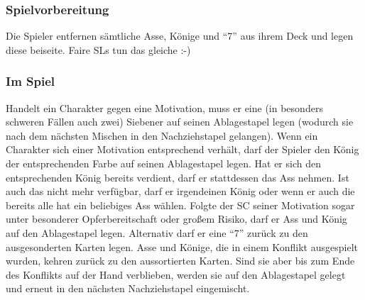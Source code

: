 \subsubsection{Spielvorbereitung}
Die Spieler entfernen sämtliche Asse, Könige und "`7"' aus ihrem Deck und legen diese beiseite. Faire SLs tun das gleiche :-)
\subsubsection{Im Spiel}
Handelt ein Charakter gegen eine Motivation, muss er eine (in besonders schweren Fällen auch zwei) Siebener auf seinen Ablagestapel legen (wodurch sie nach dem nächsten Mischen in den Nachziehstapel gelangen). Wenn ein Charakter sich einer Motivation entsprechend verhält, darf der Spieler den König der entsprechenden Farbe auf seinen Ablagestapel legen. Hat er sich den entsprechenden König bereits verdient, darf er stattdessen das Ass nehmen. Ist auch das nicht mehr verfügbar, darf er irgendeinen König oder wenn er auch die bereits alle hat ein beliebiges Ass wählen. Folgte der SC seiner Motivation sogar unter besonderer Opferbereitschaft oder großem Risiko, darf er Ass und König auf den Ablagestapel legen. Alternativ darf er eine "`7"' zurück zu den ausgesonderten Karten legen. Asse und Könige, die in einem Konflikt ausgespielt wurden, kehren zurück zu den aussortierten Karten. Sind sie aber bis zum Ende des Konflikts auf der Hand verblieben, werden sie auf den Ablagestapel gelegt und erneut in den nächsten Nachziehstapel eingemischt.



